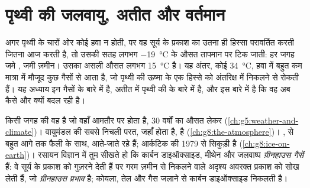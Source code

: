 \chapter{पृथ्वी की जलवायु, अतीत और वर्तमान}\label{ch:g9:climate-past-and-present}

अगर पृथ्वी के चारों ओर कोई हवा न होती, पर वह सूर्य के प्रकाश का उतना ही हिस्सा परावर्तित
करती जितना आज करती है, तो उसकी सतह लगभग \qty{-19}{\degreeCelsius} के औसत तापमान पर
टिक जाती: हर जगह जमे , जमी ज़मीन। उसका असली औसत लगभग \qty{15}{\degreeCelsius}
है। यह अंतर, कोई \qty{34}{\degreeCelsius}, हवा में बहुत कम मात्रा में मौजूद कुछ गैसों
से आता है, जो पृथ्वी की ऊष्मा के एक हिस्से को अंतरिक्ष में निकलने से रोकती हैं। यह
अध्याय इन गैसों के बारे में है, अतीत में पृथ्वी की  के बारे में है, और इस बारे में
है कि वह अब कैसे और क्यों बदल रही है।

\begin{recall}
किसी जगह की  वह  है जो वहाँ आमतौर पर होता है, 30 वर्षों का औसत लेकर
(\cref{ch:g5:weather-and-climate})। वायुमंडल की सबसे निचली परत, जहाँ  होता है,
 है (\cref{ch:g8:the-atmosphere})। ,  से बहुत आगे तक फैली
 के साथ, आते-जाते रहे हैं; आर्कटिक की  1979 से सिकुड़ी है
(\cref{ch:g8:ice-on-earth})। रसायन विज्ञान में तुम सीखते हो कि कार्बन डाइऑक्साइड,
मीथेन और जलवाष्प \emph{ग्रीनहाउस गैसें} हैं: वे सूर्य के प्रकाश को गुज़रने देती हैं पर
गरम ज़मीन से निकलने वाले अदृश्य अवरक्त प्रकाश को सोख लेती हैं, जो \emph{ग्रीनहाउस
प्रभाव} है; कोयला, तेल और गैस जलाने से कार्बन डाइऑक्साइड निकलती
है।
\end{recall}

